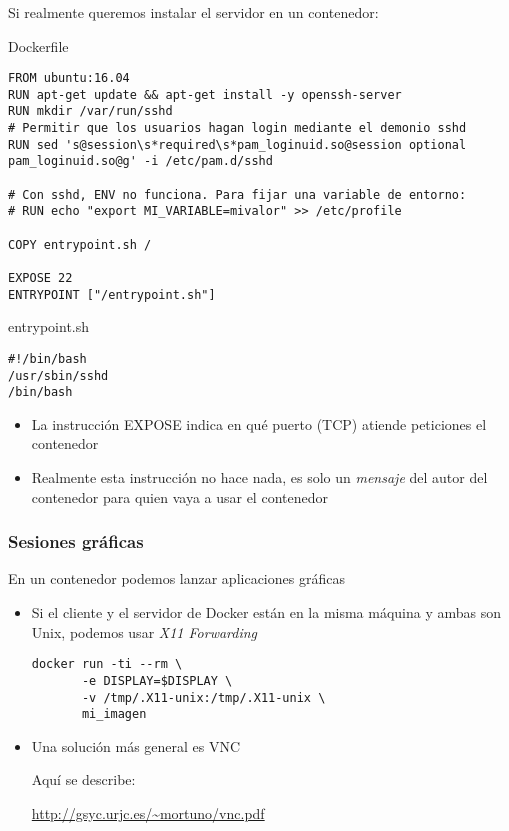 \documentclass[ucs]{beamer}
\begin{document}
\begin{frame}[fragile]
\frametitle{}

Si realmente queremos instalar el servidor en un contenedor:

Dockerfile 
  \begin{tiny}
  \begin{verbatim}
FROM ubuntu:16.04
RUN apt-get update && apt-get install -y openssh-server
RUN mkdir /var/run/sshd
# Permitir que los usuarios hagan login mediante el demonio sshd
RUN sed 's@session\s*required\s*pam_loginuid.so@session optional pam_loginuid.so@g' -i /etc/pam.d/sshd

# Con sshd, ENV no funciona. Para fijar una variable de entorno:
# RUN echo "export MI_VARIABLE=mivalor" >> /etc/profile

COPY entrypoint.sh /

EXPOSE 22
ENTRYPOINT ["/entrypoint.sh"]
  \end{verbatim}
  \end{tiny}

entrypoint.sh
  \begin{scriptsize}
  \begin{verbatim}
#!/bin/bash
/usr/sbin/sshd 
/bin/bash
  \end{verbatim}
  \end{scriptsize}


\begin{itemize}
\item
La instrucción EXPOSE indica en qué puerto (TCP) atiende peticiones el contenedor
\item
Realmente esta instrucción no hace nada, es solo un \emph{mensaje} del autor 
del contenedor para quien vaya a usar el contenedor
\end{itemize}

\end{frame}



\begin{frame}[fragile]
\frametitle{Sesiones gráficas}
En un contenedor podemos lanzar aplicaciones gráficas
\begin{itemize}
\item
Si el cliente y el servidor de Docker están en la misma máquina y ambas son
Unix, podemos usar \emph{X11 Forwarding}

  \begin{scriptsize}
  \begin{verbatim}
docker run -ti --rm \
       -e DISPLAY=$DISPLAY \
       -v /tmp/.X11-unix:/tmp/.X11-unix \
       mi_imagen
  \end{verbatim}
  \end{scriptsize}
\item
Una solución más general es VNC

Aquí se describe:

\url{http://gsyc.urjc.es/~mortuno/vnc.pdf}


\end{itemize}

\end{frame}




\end{document}
